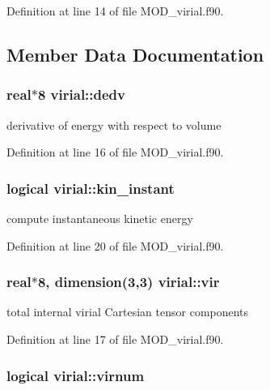 Definition at line 14 of file M\-O\-D\-\_\-virial.\-f90.



\subsection{Member Data Documentation}
\hypertarget{classvirial_aa9da403ba1215d1759ba52399c1af25c}{
\subsubsection[{dedv}]{\setlength{\rightskip}{0pt plus 5cm}real$\ast$8 virial\-::dedv}}\label{classvirial_aa9da403ba1215d1759ba52399c1af25c}


derivative of energy with respect to volume 



Definition at line 16 of file M\-O\-D\-\_\-virial.\-f90.

\hypertarget{classvirial_a423276a83510de863f538f196a7aece6}{
\subsubsection[{kin\-\_\-instant}]{\setlength{\rightskip}{0pt plus 5cm}logical virial\-::kin\-\_\-instant}}\label{classvirial_a423276a83510de863f538f196a7aece6}


compute instantaneous kinetic energy 



Definition at line 20 of file M\-O\-D\-\_\-virial.\-f90.

\hypertarget{classvirial_a9d3855a65c2cea6288a7450d8540a1da}{
\subsubsection[{vir}]{\setlength{\rightskip}{0pt plus 5cm}real$\ast$8, dimension(3,3) virial\-::vir}}\label{classvirial_a9d3855a65c2cea6288a7450d8540a1da}


total internal virial Cartesian tensor components 



Definition at line 17 of file M\-O\-D\-\_\-virial.\-f90.

\hypertarget{classvirial_aa0d0175e1cfd29907eb96e5e6b36644c}{
\subsubsection[{virnum}]{\setlength{\rightskip}{0pt plus 5cm}logical virial\-::virnum}}\label{classvirial_aa0d0175e1cfd29907eb96e5e6b36644c}


